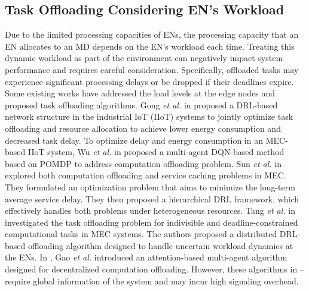\documentclass[10pt, journal,letterpaper]{IEEEtran}
\begin{document}
\subsection{Task Offloading Considering EN's Workload}
Due to the limited processing capacities of ENs, the processing capacity that an EN allocates to an MD depends on the EN's workload each time. Treating this dynamic workload as part of the environment can negatively impact system performance and requires careful consideration. Specifically, offloaded tasks may experience significant processing delays or be dropped if their deadlines expire. Some existing works have addressed the load levels at the edge nodes and proposed task offloading algorithms.
Gong \textit{et al.} in \cite{gong2022edge} proposed a DRL-based network structure in the industrial IoT (IIoT) systems to jointly optimize task offloading and resource allocation to achieve lower energy consumption and decreased task delay.
To optimize delay and energy consumption in an MEC-based IIoT system, Wu \textit{et al.} in \cite{wu2023multi} proposed a multi-agent DQN-based method based on POMDP to address computation offloading problem.
Sun \textit{et al.} in \cite{sun2024hierarchical} explored both computation offloading and service caching problems in MEC. They formulated an optimization problem that aims to minimize the long-term average service delay. They then proposed a hierarchical DRL framework, which effectively handles both problems under heterogeneous resources.
Tang \textit{et al.} in \cite{9253665} investigated the task offloading problem for indivisible and deadline-constrained computational tasks in MEC systems. The authors proposed a distributed DRL-based offloading algorithm designed to handle uncertain workload dynamics at the ENs. 
 In \cite{gao2022large}, Gao \textit{et al.} introduced an attention-based multi-agent algorithm designed for decentralized computation offloading.
However, these algorithms in \cite{gong2022edge}–\cite{gao2022large} require global information of the system and may incur high signaling overhead.

\end{document}
